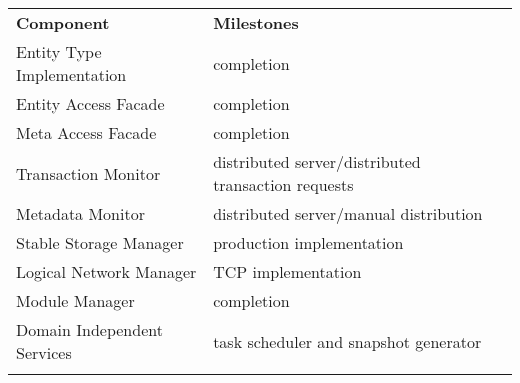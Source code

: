 \documentclass[a4paper, 10pt]{book}
\begin{document}
                                        \begin{center}\begin{footnotesize}\begin{tabular}{||l|l||} \hhline{|t:==:t|}
                                            \textbf{Component}          & \textbf{Milestones}                            %
                                            \\ \hhline{|:==:|} 
                                            Entity Type Implementation  & completion                                     %
                                            \\ \hhline{||--||}
                                            Entity Access Facade        & completion                                     %
                                            \\ \hhline{||--||}
                                            Meta Access Facade          & completion                           %
                                            \\ \hhline{||--||}
                                            Transaction Monitor         & distributed server/distributed transaction requests                             %
                                            \\ \hhline{||--||}
                                            Metadata Monitor            & distributed server/manual distribution                                  %
                                            \\ \hhline{||--||}
                                            Stable Storage Manager      & production implementation              %
                                            \\ \hhline{||--||}
                                            Logical Network Manager     & TCP implementation          %
                                            \\ \hhline{||--||}
                                            Module Manager              & completion                                     %
                                            \\ \hhline{||--||}
                                            Domain Independent Services & task scheduler and snapshot generator  %
                                            \\ \hhline{|b:==:b|}
                                        \end{tabular}\end{footnotesize}\end{center}
\end{document}

